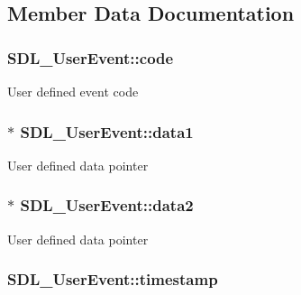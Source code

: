 \subsection{Member Data Documentation}
\subsubsection[{\texorpdfstring{code}{code}}]{ S\+D\+L\+\_\+\+User\+Event\+::code}\hypertarget{struct_s_d_l___user_event_aef47976781ee82b527a353c5acfa0a34}{}\label{struct_s_d_l___user_event_aef47976781ee82b527a353c5acfa0a34}
User defined event code 
\subsubsection[{\texorpdfstring{data1}{data1}}]{$\ast$ S\+D\+L\+\_\+\+User\+Event\+::data1}\hypertarget{struct_s_d_l___user_event_ab2893a12be2f97195f16463a23107913}{}\label{struct_s_d_l___user_event_ab2893a12be2f97195f16463a23107913}
User defined data pointer 
\subsubsection[{\texorpdfstring{data2}{data2}}]{$\ast$ S\+D\+L\+\_\+\+User\+Event\+::data2}\hypertarget{struct_s_d_l___user_event_aae4dbf65c34d654c9edf519eb061b7cf}{}\label{struct_s_d_l___user_event_aae4dbf65c34d654c9edf519eb061b7cf}
User defined data pointer 
\subsubsection[{\texorpdfstring{timestamp}{timestamp}}]{ S\+D\+L\+\_\+\+User\+Event\+::timestamp}\hypertarget{struct_s_d_l___user_event_adbf1d34c73138a0c549310e5d4ad0c35}{}\label{struct_s_d_l___user_event_adbf1d34c73138a0c549310e5d4ad0c35}
